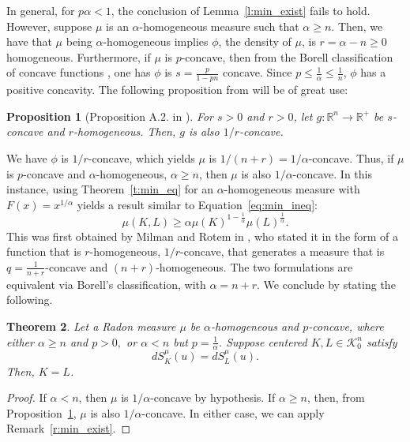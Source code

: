 \documentclass[11pt]{amsart}
\newtheorem{theorem}{Theorem}[section]
\newtheorem{proposition}[theorem]{Proposition}
\theoremstyle{definition}
\theoremstyle{remark}
\numberwithin{equation}{section}
\newcommand{\R}{\mathbb{R}}
\newcommand{\conbod}{\mathcal{K}^n}
\begin{document}
In general, for $p\alpha < 1$, the conclusion of Lemma~\ref{l:min_exist} fails to hold. However, suppose $\mu$ is an $\alpha$-homogeneous measure such that $\alpha\geq n$. Then, we have that $\mu$ being $\alpha$-homogeneous implies $\phi$, the density of $\mu$, is $r\!=\! \alpha\!-\!n$$\geq \!0$ homogeneous. Furthermore, if $\mu$ is $p$-concave, then from the Borell classification of concave functions \cite{Bor75}, one has $\phi$ is $s=\frac{p}{1-pn}$ concave. Since $p\leq \frac{1}{\alpha}\leq \frac{1}{n}$, $\phi$ has a positive concavity. The following proposition from \cite{GAL19} will be of great use: \\
\begin{proposition}[Proposition A.2. in \cite{GAL19}]\label{p:gal} For $s > 0$ and $r > 0$, let $g: \R^n \to \R^+$ be $s$-concave and $r$-homogeneous. Then, $g$ is also $1/r$-concave.
\end{proposition}
We have $\phi$ is $1/r$-concave, which yields $\mu$ is $1/(n+r)=1/\alpha$-concave. Thus, if $\mu$ is $p$-concave and $\alpha$-homogeneous, $\alpha\geq n$, then $\mu$ is also $1/\alpha$-concave. In this instance, using Theorem~\ref{t:min_eq} for an $\alpha$-homogeneous measure with $F(x)=x^{1/\alpha}$ yields a result similar to Equation~\ref{eq:min_ineq}:
\begin{equation}
\mu(K, L) \geq \alpha\mu(K)^{1-\frac{1}{\alpha}} \mu(L)^{\frac{1}{\alpha}}.
\label{eq:mr}
\end{equation}
This was first obtained by Milman and Rotem in \cite{MR14}, who stated it in the form of a function that is $r$-homogeneous, $1/r$-concave, that generates a measure that is $q=\frac{1}{n+r}$-concave and $(n+r)$-homogeneous. The two formulations are equivalent via Borell's classification, with $\alpha=n+r$. We conclude by stating the following.
\begin{theorem}
\label{t:min_exist}
Let a Radon measure $\mu$ be $\alpha$-homogeneous and $p$-concave, where either $\alpha\geq n$ and $p>0,$ or $\alpha<n$ but $p=\frac{1}{\alpha}$. Suppose centered $K,L\in\conbod_0$ satisfy
$$dS^{\mu}_{K}(u)=dS^{\mu}_{L}(u).$$
Then, $K=L$.
\end{theorem}
\begin{proof}
If $\alpha<n$, then $\mu$ is $1/\alpha$-concave by hypothesis. If $\alpha\geq n$, then, from Proposition~\ref{p:gal}, $\mu$ is also $1/\alpha$-concave. In either case, we can apply Remark~\ref{r:min_exist}.
\end{proof}
\end{document}
